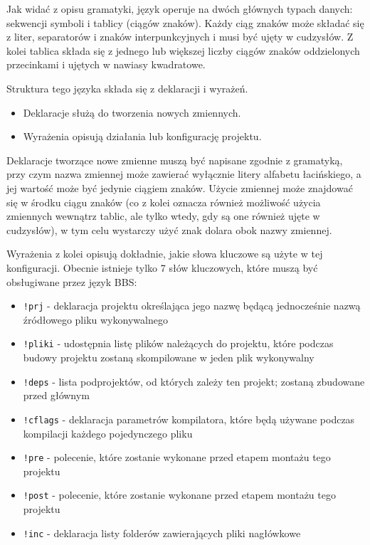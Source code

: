 Jak widać z opisu gramatyki, język operuje na dwóch głównych typach danych: sekwencji symboli i tablicy (ciągów znaków). Każdy ciąg znaków może składać się z liter, separatorów i znaków interpunkcyjnych i musi być ujęty w cudzysłów. Z kolei tablica składa się z jednego lub większej liczby ciągów znaków oddzielonych przecinkami i ujętych w nawiasy kwadratowe.

Struktura tego języka składa się z deklaracji i wyrażeń.
\begin{itemize}
    \item Deklaracje służą do tworzenia nowych zmiennych.
    \item Wyrażenia opisują działania lub konfigurację projektu.
\end{itemize}

Deklaracje tworzące nowe zmienne muszą być napisane zgodnie z gramatyką, przy czym nazwa zmiennej może zawierać wyłącznie litery alfabetu łacińskiego, a jej wartość może być jedynie ciągiem znaków. Użycie zmiennej może znajdować się w środku ciągu znaków (co z kolei oznacza również możliwość użycia zmiennych wewnątrz tablic, ale tylko wtedy, gdy są one również ujęte w cudzysłów), w tym celu wystarczy użyć znak dolara obok nazwy zmiennej.

Wyrażenia z kolei opisują dokładnie, jakie słowa kluczowe są użyte w tej konfiguracji. Obecnie istnieje tylko 7 słów kluczowych, które muszą być obsługiwane przez język BBS:
\begin{itemize}
    \item \texttt{!prj} - deklaracja projektu określająca jego nazwę będącą jednocześnie nazwą źródłowego pliku wykonywalnego
    \item \texttt{!pliki} - udostępnia listę plików należących do projektu, które podczas budowy projektu zostaną skompilowane w jeden plik wykonywalny
    \item \texttt{!deps} - lista podprojektów, od których zależy ten projekt; zostaną zbudowane przed głównym
    \item \texttt{!cflags} - deklaracja parametrów kompilatora, które będą używane podczas kompilacji każdego pojedynczego pliku
    \item \texttt{!pre} - polecenie, które zostanie wykonane przed etapem montażu tego projektu
    \item \texttt{!post} - polecenie, które zostanie wykonane przed etapem montażu tego projektu
    \item \texttt{!inc} - deklaracja listy folderów zawierających pliki nagłówkowe
\end{itemize}

